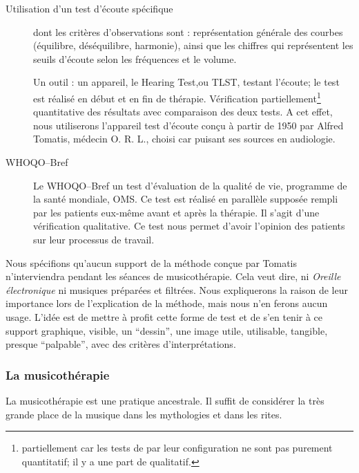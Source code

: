 \begin{description}
	\item[Utilisation d'un test d'écoute spécifique] dont les critères d'observations sont : représentation générale des courbes (équilibre, déséquilibre, harmonie), ainsi que les chiffres qui représentent les seuils d'écoute selon les fréquences et le volume. 
		
	Un outil :  un appareil, le Hearing Test,ou TLST, testant l'écoute; le test est réalisé en début et en fin de thérapie. 
	Vérification partiellement\footnote{partiellement  car les tests de par leur configuration ne sont pas purement quantitatif; il y a une part de qualitatif.} quantitative des résultats avec comparaison des deux tests. 
	A cet effet, nous utiliserons l'appareil test d'écoute conçu à partir de 1950 par Alfred Tomatis, médecin O. R. L., choisi car puisant ses sources en audiologie.
	
	
	
	\item[WHOQO--Bref] Le WHOQO--Bref un test d'évaluation de la qualité de vie, programme de la santé mondiale, OMS.
	Ce test est réalisé en parallèle supposée rempli par les patients eux-même  avant et après la thérapie.
	Il s'agit d'une vérification qualitative. Ce test nous permet d'avoir l'opinion des patients sur leur processus de travail.
	
	
	 
\end{description}


Nous spécifions qu'aucun support de la méthode conçue par Tomatis n'interviendra pendant les séances de musicothérapie.
Cela veut dire, ni 
\textsl{Oreille
	électronique} ni musiques préparées et filtrées. Nous expliquerons la 
raison de   leur importance lors de l'explication de la méthode, mais nous n'en ferons aucun usage. L'idée est de 
mettre à profit cette forme de test et de  s'en tenir à ce support
graphique, visible, un ``dessin'', une image utile, utilisable, tangible,
presque ``palpable'', avec des critères
d'interprétations.
	


\subsubsection{La musicothérapie}
La musicothérapie est une pratique ancestrale. Il suffit de considérer la très 
grande  place de la musique dans les mythologies et dans les rites. 

